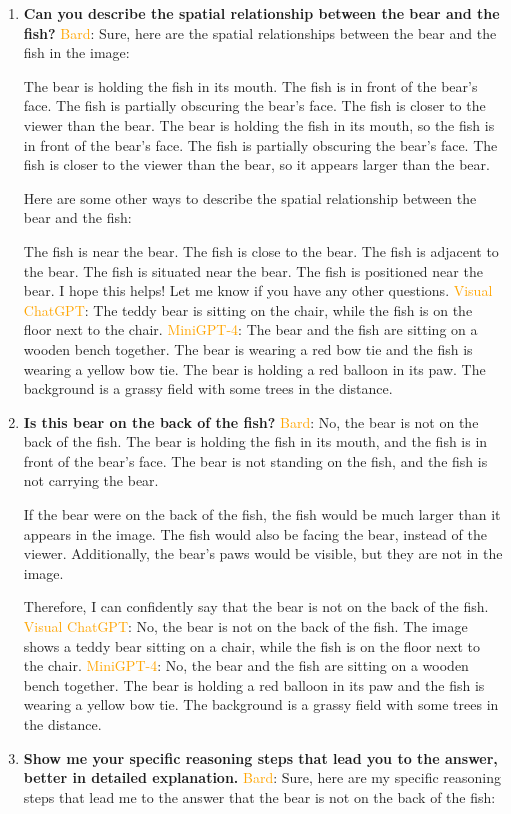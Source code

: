    \begin{enumerate}
        \item \textbf{Can you describe the spatial relationship between the bear and the fish?}
        \subitem \textcolor{orange}{Bard}:
        Sure, here are the spatial relationships between the bear and the fish in the image:

        The bear is holding the fish in its mouth.
        The fish is in front of the bear's face.
        The fish is partially obscuring the bear's face.
        The fish is closer to the viewer than the bear.
        The bear is holding the fish in its mouth, so the fish is in front of the bear's face. The fish is partially obscuring the bear's face. The fish is closer to the viewer than the bear, so it appears larger than the bear.

        Here are some other ways to describe the spatial relationship between the bear and the fish:

        The fish is near the bear.
        The fish is close to the bear.
        The fish is adjacent to the bear.
        The fish is situated near the bear.
        The fish is positioned near the bear.
        I hope this helps! Let me know if you have any other questions.
        \subitem \textcolor{orange}{Visual ChatGPT}: The teddy bear is sitting on the chair, while the fish is on the floor next to the chair.
        \subitem \textcolor{orange}{MiniGPT-4}: The bear and the fish are sitting on a wooden bench together. The bear is wearing a red bow tie and the fish is wearing a yellow bow tie. The bear is holding a red balloon in its paw. The background is a grassy field with some trees in the distance.
        \item \textbf{Is this bear on the back of the fish?}
        \subitem \textcolor{orange}{Bard}:
        No, the bear is not on the back of the fish. The bear is holding the fish in its mouth, and the fish is in front of the bear's face. The bear is not standing on the fish, and the fish is not carrying the bear.
        
        If the bear were on the back of the fish, the fish would be much larger than it appears in the image. The fish would also be facing the bear, instead of the viewer. Additionally, the bear's paws would be visible, but they are not in the image.
        
        Therefore, I can confidently say that the bear is not on the back of the fish.
        \subitem \textcolor{orange}{Visual ChatGPT}: No, the bear is not on the back of the fish. The image shows a teddy bear sitting on a chair, while the fish is on the floor next to the chair.
        \subitem \textcolor{orange}{MiniGPT-4}: No, the bear and the fish are sitting on a wooden bench together. The bear is holding a red balloon in its paw and the fish is wearing a yellow bow tie. The background is a grassy field with some trees in the distance.
        \item \textbf{Show me your specific reasoning steps that lead you to the answer, better in detailed explanation.}
        \subitem \textcolor{orange}{Bard}:
        Sure, here are my specific reasoning steps that lead me to the answer that the bear is not on the back of the fish:
        

\end{enumerate}
